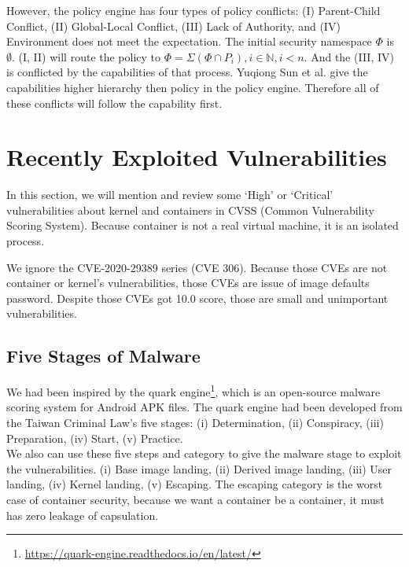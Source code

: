 However, the policy engine has four types of policy conflicts: (\RN{1}) Parent-Child Conflict,
(\RN{2}) Global-Local Conflict, (\RN{3}) Lack of Authority, and  (\RN{4}) Environment does not
meet the expectation. The initial security namespace $\Phi$ is $\emptyset$. (\RN{1},
\RN{2}) will route the policy to $\Phi = \Sigma (\Phi \cap P_i), i \in \mathbb{N}, i < n$.
And the (\RN{3}, \RN{4}) is conflicted by the capabilities of that process. Yuqiong Sun et al.\cite{217614}
give the capabilities higher hierarchy then policy in the policy engine. Therefore
all of these conflicts will follow the capability first.

\section{Recently Exploited Vulnerabilities}
In this section, we will mention and review some `High' or `Critical' vulnerabilities
about kernel and containers in CVSS (Common Vulnerability Scoring System).
Because container is not a real virtual machine, it is an isolated process.

We ignore the CVE-2020-29389 series (CVE 306). Because those CVEs are not container or kernel's
vulnerabilities, those CVEs are issue of image defaults password. Despite those CVEs got 10.0 score,
those are small and unimportant vulnerabilities.

\subsection{Five Stages of Malware}
We had been inspired by the quark engine\footnote{\url{https://quark-engine.readthedocs.io/en/latest/}},
which is an open-source malware scoring system for Android APK files. The quark
engine had been developed from the Taiwan Criminal Law's five stages:
(\Rn{1}) Determination, (\Rn{2}) Conspiracy, (\Rn{3}) Preparation, (\Rn{4}) Start, (\Rn{5}) Practice.\\

We also can use these five steps and category to give the malware stage to exploit the vulnerabilities.
(\Rn{1}) Base image landing, (\Rn{2}) Derived image landing, (\Rn{3}) User landing, (\Rn{4}) Kernel landing,
(\Rn{5}) Escaping. The escaping category is the worst case of container security, because we want a
container be a container, it must has zero leakage of capsulation.

